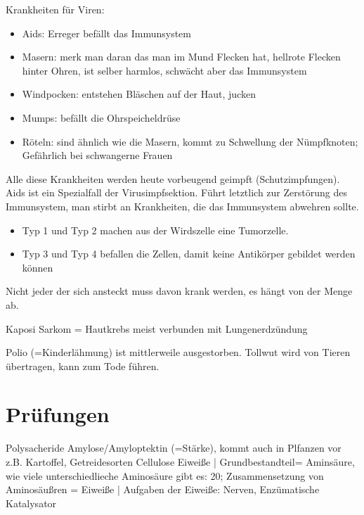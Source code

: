 \documentclass[a4paper]{article}
\begin{document}
Krankheiten für Viren:

\begin{itemize}
\item Aids: Erreger befällt das Immunsystem
\item Masern: merk man daran das man im Mund Flecken hat, hellrote Flecken hinter Ohren, ist selber harmlos, schwächt aber das Immunsystem
\item Windpocken: entstehen Bläschen auf der Haut, jucken
\item Mumps: befällt die Ohrspeicheldrüse
\item Röteln: sind ähnlich wie die Masern, kommt zu Schwellung der Nümpfknoten; Gefährlich bei schwangerne Frauen

\end{itemize}

Alle diese Krankheiten werden heute vorbeugend geimpft (Schutzimpfungen). Aids ist ein Spezialfall der Virusimpfsektion. Führt letztlich zur Zerstörung des Immunsystem, man stirbt an Krankheiten, die das Immunsystem abwehren sollte.

\begin{itemize}
\item Typ 1 und Typ 2 machen aus der Wirdszelle eine Tumorzelle.
\item Typ 3 und Typ 4 befallen die Zellen, damit keine Antikörper gebildet werden können
\end{itemize}

Nicht jeder der sich ansteckt muss davon krank werden, es hängt von der Menge ab.

Kaposi Sarkom = Hautkrebs meist verbunden mit Lungenerdzündung

Polio (=Kinderlähmung) ist mittlerweile ausgestorben.
Tollwut wird von Tieren übertragen, kann zum Tode führen.

\section{Prüfungen}

Polysacheride Amylose/Amyloptektin (=Stärke), kommt auch in Plfanzen vor z.B. Kartoffel, Getreidesorten
Cellulose
Eiweiße | Grundbestandteil= Aminsäure, wie viele unterschiedlieche Aminosäure gibt es: 20; Zusammensetzung von Aminosäußren = Eiweiße | Aufgaben der Eiweiße: Nerven, Enzümatische Katalysator
\end{document}
